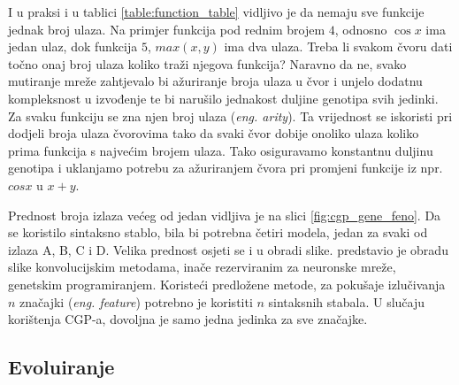I u praksi i u tablici \ref{table:function_table} vidljivo je da nemaju sve funkcije jednak broj ulaza.
Na primjer funkcija pod rednim brojem $4$, odnosno $\cos{x}$ ima jedan ulaz, dok funkcija $5$, $max(x, y)$ ima dva ulaza.
Treba li svakom čvoru dati točno onaj broj ulaza koliko traži njegova funkcija?
Naravno da ne, svako mutiranje mreže zahtjevalo bi ažuriranje broja ulaza u čvor i unjelo dodatnu kompleksnost u izvođenje te bi narušilo jednakost duljine genotipa svih jedinki.
Za svaku funkciju se zna njen broj ulaza (\emph{eng. arity}).
Ta vrijednost se iskoristi pri dodjeli broja ulaza čvorovima tako da svaki čvor dobije onoliko ulaza koliko prima funkcija s najvećim brojem ulaza.
Tako osiguravamo konstantnu duljinu genotipa i uklanjamo potrebu za ažuriranjem čvora pri promjeni funkcije iz npr. $cos{x}$ u $x + y$.

Prednost broja izlaza većeg od jedan vidljiva je na slici \ref{fig:cgp_gene_feno}.
Da se koristilo sintaksno stablo, bila bi potrebna četiri modela, jedan za svaki od izlaza A, B, C i D.
Velika prednost osjeti se i u obradi slike.
\cite{conv_gp} predstavio je obradu slike konvolucijskim metodama, inače rezerviranim za neuronske mreže, genetskim programiranjem.
Koristeći predložene metode, za pokušaje izlučivanja $n$ značajki (\emph{eng. feature}) potrebno je koristiti $n$ sintaksnih stabala.
U slučaju korištenja CGP-a, dovoljna je samo jedna jedinka za sve značajke.

\subsection{Evoluiranje}
